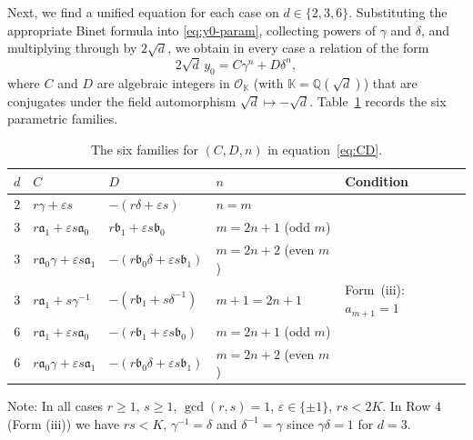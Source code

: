 \documentclass[11pt,a4paper]{article}
\numberwithin{equation}{section}
\numberwithin{table}{section}
\numberwithin{figure}{section}
\begin{document}
\medskip 

Next, we find a unified equation for each case on $d\in\{2,3,6\}$. Substituting the appropriate Binet formula into \eqref{eq:y0-param},
collecting powers of $\gamma$ and $\delta$, and multiplying through by
$2\sqrt{d}$, we obtain in every case a relation of the form
\begin{equation}\label{eq:CD}
	2\sqrt{d}\,y_0 = C\gamma^n + D\delta^n,
\end{equation}
where $C$ and $D$ are algebraic integers in $\mathcal{O}_{\mathbb{K}}$
(with $\mathbb{K} = \mathbb{Q}(\sqrt{d})$) that are conjugates under the
field automorphism $\sqrt{d}\mapsto -\sqrt{d}$.
Table~\ref{tab:CD} records the six parametric families.

\begin{table}[H]
	\centering
	
	\label{tab:CD}
	\renewcommand{\arraystretch}{1.4}
	\begin{tabular}{cllll}
		\toprule
		$d$ & $C$ & $D$ & $n$ & Condition \\
		\midrule
		$2$ & $r\gamma+\varepsilon s$
		& $-(r\delta+\varepsilon s)$
		& $n=m$
		& \\[4pt]
		$3$ & $r\mathfrak{a}_1+\varepsilon s\mathfrak{a}_0$
		& $r\mathfrak{b}_1+\varepsilon s\mathfrak{b}_0$
		& $m=2n+1$ (odd $m$)
		& \\[4pt]
		$3$ & $r\mathfrak{a}_0\gamma+\varepsilon s\mathfrak{a}_1$
		& $-(r\mathfrak{b}_0\delta+\varepsilon s\mathfrak{b}_1)$
		& $m=2n+2$ (even $m$)
		& \\[4pt]
		$3$ & $r\mathfrak{a}_1+s\gamma^{-1}$
		& $-(r\mathfrak{b}_1+s\delta^{-1})$
		& $m+1=2n+1$
		& Form~{\rm(iii)}: $a_{m+1}=1$ \\[4pt]
		$6$ & $r\mathfrak{a}_1+\varepsilon s\mathfrak{a}_0$
		& $-(r\mathfrak{b}_1+\varepsilon s\mathfrak{b}_0)$
		& $m=2n+1$ (odd $m$)
		& \\[4pt]
		$6$ & $r\mathfrak{a}_0\gamma+\varepsilon s\mathfrak{a}_1$
		& $-(r\mathfrak{b}_0\delta+\varepsilon s\mathfrak{b}_1)$
		& $m=2n+2$ (even $m$)
		& \\
		\bottomrule
	\end{tabular}
	\caption{The six families for $(C,D,n)$ in equation~\eqref{eq:CD}.}
\end{table}

\noindent
Note: In all cases $r\geq 1$, $s\geq 1$, $\gcd(r,s)=1$,
$\varepsilon\in\{\pm 1\}$, $rs<2K$. In Row 4 (Form {\rm(iii)})
we have $rs < K$, $\gamma^{-1}=\delta$ and $\delta^{-1}=\gamma$ since $\gamma\delta=1$ for $d=3$.
\end{document}
